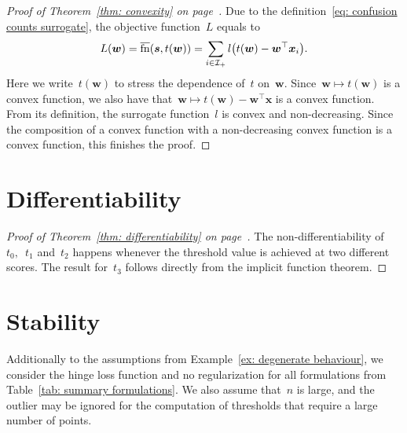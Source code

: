\thmconvex*
\begin{proof}[Proof of Theorem~\ref{thm: convexity} on page~\pageref{thm: convexity}]
  Due to the definition~\eqref{eq: confusion counts surrogate}, the objective function~$L$ equals to
  \begin{equation*}
    L(\bm{w}) = \fns(\bm{s}, t(\bm{w})) = \sum_{i \in \Ipos} l \Brac{t(\bm{w}) - \bm{w}^{\top} \bm{x}_i}.
  \end{equation*}
  Here we write~$t(\bm{w})$ to stress the dependence of~$t$ on~$\bm{w}$. Since~$\bm{w}\mapsto t(\bm{w})$ is a convex function, we also have that~$\bm{w} \mapsto t(\bm{w}) - \bm{w}^{\top} \bm{x}$ is a convex function. From its definition, the surrogate function~$l$ is convex and non-decreasing.  Since the composition of a convex function with a non-decreasing convex function is a convex function, this finishes the proof.
\end{proof}

\section{Differentiability}

\derivative* 
\begin{proof}[Proof of Theorem~\ref{thm: differentiability} on page~\pageref{thm: differentiability}]
  The non-differentiability of~$t_0,$~$t_1$ and~$t_2$ happens whenever the threshold value is achieved at two different scores. The result for~$t_3$ follows directly from the implicit function theorem. 
\end{proof}

\newpage

\section{Stability}\label{app: stability}

\degeneratebehavior*

Additionally to the assumptions from Example~\ref{ex: degenerate behaviour}, we consider the hinge loss function and no regularization for all formulations from Table~\ref{tab: summary formulations}. We also assume that~$n$ is large, and the outlier may be ignored for the computation of thresholds that require a large number of points.

